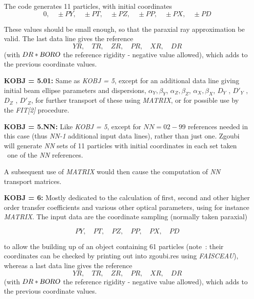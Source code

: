 \noindent The code generates  11 particles,  with initial coordinates 
$$ 0,\quad \pm PY,\quad \pm PT,\quad \pm PZ,\quad \pm PP, \quad \pm PX, \quad \pm PD $$

\noindent These values should be small enough, so that the paraxial ray
approximation be valid. 
 The last data line gives  the reference 
$$YR, \quad TR, \quad ZR, \quad PR, \quad XR, \quad DR $$
(with $ DR\ast \textsl{BORO}$  the reference rigidity - negative value allowed), which adds to the previous 
coordinate  values.


\bigskip

\noindent\textbf{KOBJ = 5.01:} Same as \textsl{KOBJ = 5}, except for an additional data line giving 
initial beam ellipse parameters and  dispersions,  
$\alpha_Y, \beta_Y$, $\alpha_Z, \beta_Z$, $\alpha_X, \beta_X$, $D_Y$ , $D'_Y$ , $D_Z$ , $D'_Z$,  
 for further transport of these using \textsl{MATRIX}, or for  possible use by the \textsl{FIT[2]} procedure. 

\bigskip

\noindent\textbf{KOBJ = 5.NN:} Like \textsl{KOBJ = 5}, except for  $NN = 02 - 99$ references needed in this case 
(thus \textsl{NN-1} additional input data lines), rather than just one. 
Zgoubi will generate  \textsl{NN} sets of 11 particles with initial  coordinates in each set taken \wrt\ one 
of the  \textsl{NN} references. 

\medskip 

\noindent A subsequent use of \textsl{MATRIX}  would then cause the computation of \textsl{NN} transport matrices. 


\bigskip

\noindent\textbf{KOBJ = 6:}  Mostly dedicated to the calculation of first, second
and other higher order transfer coefficients and various other  optical parameters, 
using for instance \textsl{MATRIX}. 
The input data are the coordinate sampling (normally taken paraxial)  

$$ PY,\quad PT,\quad PZ,\quad PP, \quad PX, \quad PD $$
 
 \noindent to allow the building up of an object containing 61 particles (note~: their coordinates can be 
checked by printing out into zgoubi.res using \textsl{FAISCEAU}), whereas   a last data line gives  the reference 
$$YR, \quad TR, \quad ZR, \quad PR, \quad XR, \quad DR $$
(with $ DR\ast \textsl{BORO}$  the reference rigidity - negative value allowed), which adds to the previous 
 coordinate values.


\bigskip


